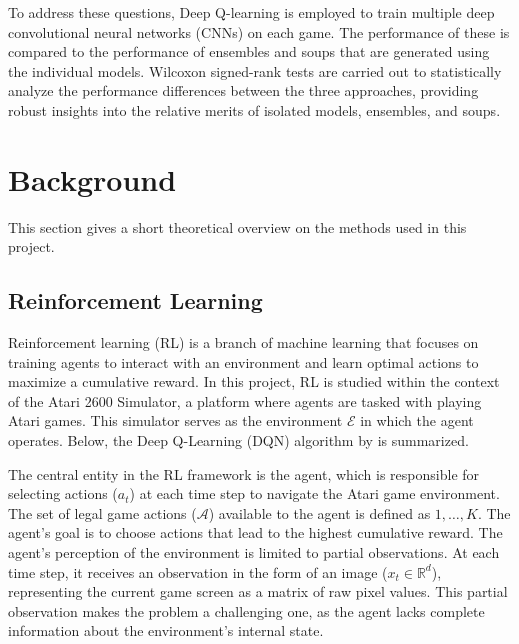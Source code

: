 To address these questions, Deep Q-learning is employed to train multiple deep convolutional neural networks (CNNs) on each game. The performance of these is compared to the performance of ensembles and soups that are generated using the individual models. Wilcoxon signed-rank tests are carried out to statistically analyze the performance differences between the three approaches, providing robust insights into the relative merits of isolated models, ensembles, and soups.


\chapter{Background}

This section gives a short theoretical overview on the methods used in this project.

\section{Reinforcement Learning}

Reinforcement learning (RL) is a branch of machine learning that focuses on training agents to interact with an environment and learn optimal actions to maximize a cumulative reward. In this project, RL is studied within the context of the Atari 2600 Simulator, a platform where agents are tasked with playing Atari games. This simulator serves as the environment $\mathcal{E}$ in which the agent operates. Below, the Deep Q-Learning (DQN) algorithm by \textcite{mnih_playing_2013} is summarized.

The central entity in the RL framework is the agent, which is responsible for selecting actions ($a_t$) at each time step to navigate the Atari game environment. The set of legal game actions ($\mathcal A$) available to the agent is defined as ${1, \dots, K}$. The agent's goal is to choose actions that lead to the highest cumulative reward. The agent's perception of the environment is limited to partial observations. At each time step, it receives an observation in the form of an image ($x_t \in \mathbb R^d$), representing the current game screen as a matrix of raw pixel values. This partial observation makes the problem a challenging one, as the agent lacks complete information about the environment's internal state.

